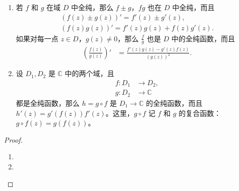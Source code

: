 \documentclass[../../main.tex]{subfiles}
\begin{document}
\begin{proposition}\label{proposition:复变函数求导运算法则}
\begin{enumerate}[(1)]
\item 若 \( f \) 和 \( g \) 在域 \( D \) 中全纯，那么 \( f \pm g \)，\( fg \) 也在 \( D \) 中全纯，而且
\begin{gather*}
(f(z) \pm g(z))' = f'(z) \pm g'(z), \\
(f(z)g(z))' = f'(z)g(z) + f(z)g'(z).
\end{gather*}
如果对每一点 \( z \in D \)，\( g(z) \neq 0 \)，那么 \( \frac{f}{g} \) 也是 \( D \) 中的全纯函数，而且
\begin{align*}
\left( \frac{f(z)}{g(z)} \right)' &= \frac{f'(z)g(z) - g'(z)f(z)}{(g(z))^2}.
\end{align*}

\item 设 \( D_1, D_2 \) 是 \( \mathbb{C} \) 中的两个域，且
\begin{align*}
f: D_1 &\to D_2, \\
g: D_2 &\to \mathbb{C}
\end{align*}
都是全纯函数，那么 \( h = g \circ f \) 是 \( D_1 \to \mathbb{C} \) 的全纯函数，而且 \( h'(z) = g'(f(z))f'(z) \)。这里，\( g \circ f \) 记 \( f \) 和 \( g \) 的复合函数：\( g \circ f(z) = g(f(z)) \)。
\end{enumerate}
\end{proposition}
\begin{proof}
\begin{enumerate}[(1)]
\item 

\item 
\end{enumerate}
\end{proof}
\end{document}
